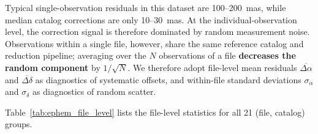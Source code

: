 \documentclass[linenumbers,amsmath,manuscript]{aastex702}
\begin{document}
Typical single-observation residuals in this dataset are 100--200~mas, while median catalog corrections are only 10--30~mas. At the individual-observation level, the correction signal is therefore dominated by random measurement noise. Observations within a single file, however, share the same reference catalog and reduction pipeline; averaging over the $N$ observations of a file \textbf{decreases the random component} by $1/\sqrt{N}$. We therefore adopt file-level mean residuals $\overline{\Delta\alpha}$ and $\overline{\Delta\delta}$ as diagnostics of systematic offsets, and within-file standard deviations $\sigma_\alpha$ and $\sigma_\delta$ as diagnostics of random scatter.

Table~\ref{tab:ephem_file_level} lists the file-level statistics for all 21 (file, catalog) groups.
\end{document}
